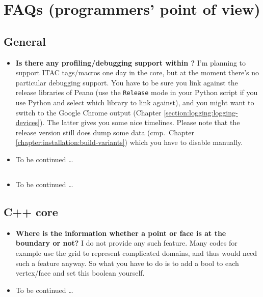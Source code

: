 \chapter{FAQs (programmers' point of view)}



\section{General}


\begin{itemize}
  \item \textbf{Is there any profiling/debugging support within \Peano?} I'm
  planning to support ITAC tags/macros one day in the core, but at the moment
  there's no particular debugging support. You have to be sure you link against
  the release libraries of Peano (use the \texttt{Release} mode in your Python
  script if you use Python and select which library to link against), and you
  might want to switch to the
  Google Chrome output (Chapter \ref{section:logging:logging-devices}). The
  latter gives you some nice timelines. Please note that the release version
  still does dump some data (cmp.~Chapter
  \ref{chapter:installation:build-variants}) which you have to disable manually.
  \item To be continued \dots
\end{itemize}



\section{\ExaHyPE}


\begin{itemize}
  \item To be continued \dots
\end{itemize}



\section{C++ core}

\begin{itemize}
  \item \textbf{Where is the information whether a point or face is at the
  boundary or not?}
  I do not provide any such feature. Many codes for example use the grid to
  represent complicated domains, and thus would need such a feature anyway. So
  what you have to do is to add a bool to each vertex/face and set this boolean
  yourself.
  \item To be continued \dots
\end{itemize}


